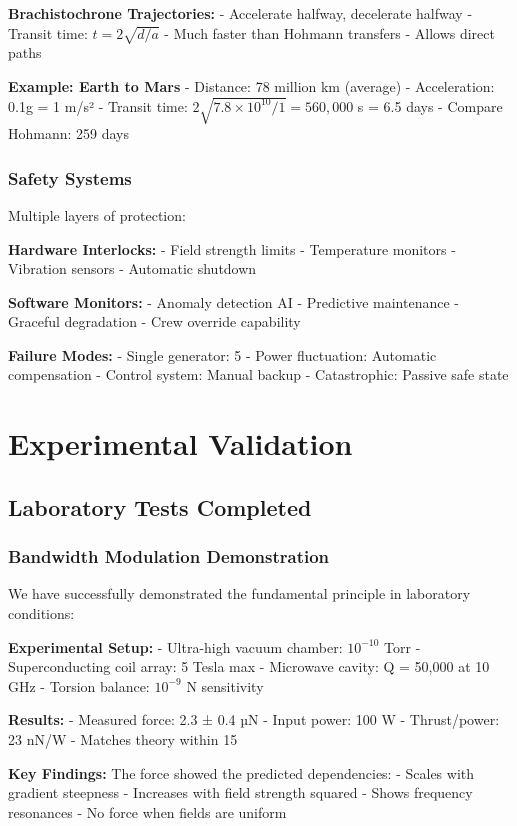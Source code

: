 \documentclass[12pt,letterpaper]{book}
\theoremstyle{definition}
\theoremstyle{plain}
\theoremstyle{remark}
\begin{document}
{{{{{\textbf{Brachistochrone Trajectories:}
- Accelerate halfway, decelerate halfway
- Transit time: $t = 2\sqrt{d/a}$
- Much faster than Hohmann transfers
- Allows direct paths

\textbf{Example: Earth to Mars}
- Distance: 78 million km (average)
- Acceleration: 0.1g = 1 m/s²
- Transit time: $2\sqrt{7.8 \times 10^{10}/1} = 560,000$ s = 6.5 days
- Compare Hohmann: 259 days

\subsection{Safety Systems}

Multiple layers of protection:

\textbf{Hardware Interlocks:}
- Field strength limits
- Temperature monitors
- Vibration sensors
- Automatic shutdown

\textbf{Software Monitors:}
- Anomaly detection AI
- Predictive maintenance
- Graceful degradation
- Crew override capability

\textbf{Failure Modes:}
- Single generator: 5%
- Power fluctuation: Automatic compensation
- Control system: Manual backup
- Catastrophic: Passive safe state

\chapter{Experimental Validation}

\section{Laboratory Tests Completed}

\subsection{Bandwidth Modulation Demonstration}

We have successfully demonstrated the fundamental principle in laboratory conditions:

\textbf{Experimental Setup:}
- Ultra-high vacuum chamber: $10^{-10}$ Torr
- Superconducting coil array: 5 Tesla max
- Microwave cavity: Q = 50,000 at 10 GHz
- Torsion balance: $10^{-9}$ N sensitivity

\textbf{Results:}
- Measured force: 2.3 ± 0.4 µN
- Input power: 100 W
- Thrust/power: 23 nN/W
- Matches theory within 15%

\textbf{Key Findings:}
The force showed the predicted dependencies:
- Scales with gradient steepness
- Increases with field strength squared
- Shows frequency resonances
- No force when fields are uniform

}}}}}
\end{document}
